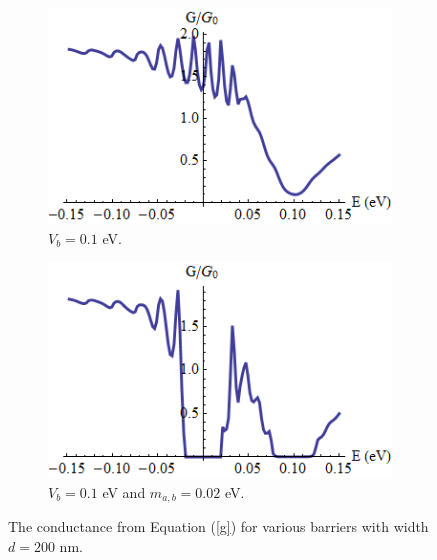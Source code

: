 \documentclass[12pt,a4paper]{report}
\begin{document}
\begin{figure}
	\begin{subfigure}{0.45\textwidth}
		\centerline{\includegraphics[scale=0.6]{images/rectangular-barrier-conductance-a}}
		\caption{$V_{b}=0.1$ eV.}
	\end{subfigure}
	\hspace{1.2cm}
	\begin{subfigure}{0.45\textwidth}
		\centerline{\includegraphics[scale=0.6]{images/rectangular-barrier-conductance-b}}
		\caption{$V_{b}=0.1$ eV and $m_{a,b}=0.02$ eV.}
	\end{subfigure}
	\caption{The conductance from Equation (\ref{g}) for various barriers with width $d=200$ nm.}
	\label{rectangular-barrier-conductance-a}
\end{figure}
\end{document}
